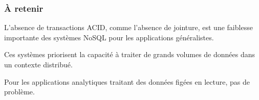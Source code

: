 \begin{frame}
\frametitle{À retenir}

\begin{redbullet}
  \item L'absence de transactions ACID, comme l'absence de jointure, est
une faiblesse importante des systèmes NoSQL pour les applications
généralistes.

  \item Ces systèmes priorisent la capacité à traiter de grands
   volumes de données dans un contexte distribué.

  \item Pour les applications analytiques traitant des données
     figées en lecture, pas de problème.
  
\end{redbullet}

\end{frame}




